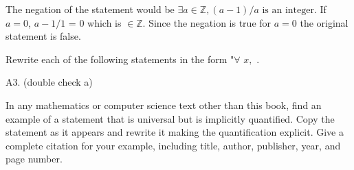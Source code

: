 \documentclass[12pt,letterpaper, onecolumn]{exam}
\begin{document}
\begin{questions}
	\begin{solution}
		The negation of the statement would be $\exists a \in \mathbb{Z}, (a-1)/a \textrm{ is an integer.}$
		If $a=0$, $a-1/1$ = $0$ which is $\in \mathbb{Z}$. Since the negation is true for $a=0$ the original statement is false.
	\end{solution}
	
	\question Rewrite each of the following statements in the form "$\forall$  \makebox[1cm]{\hrulefill} $x,$  \makebox[1cm]{\hrulefill}.
	
	\begin{solution}
		A3. (double check a)
	\end{solution}
	
	\question In any mathematics or computer science text other than this book, find an example of a statement that is universal but is implicitly quantified. Copy the statement as it appears and rewrite it making the quantification explicit. Give a complete citation for your example, including title, author, publisher, year, and page number.
	

\end{questions}
\end{document}

